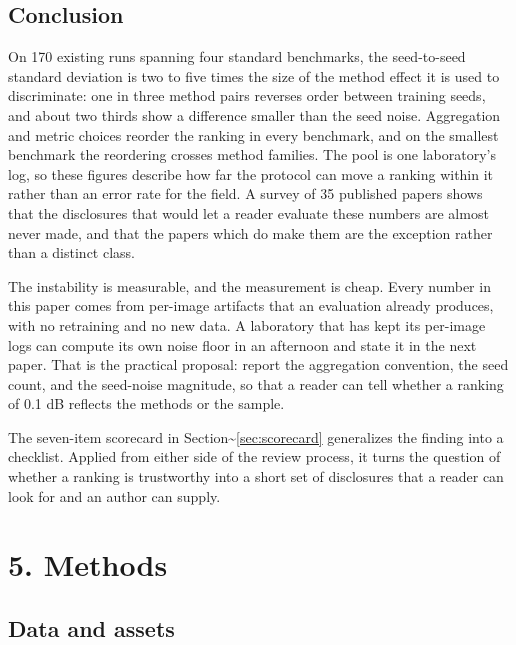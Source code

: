 \documentclass[pdflatex,sn-nature]{sn-jnl}
\begin{document}
\subsection{Conclusion}\label{sec:conclusion}

On 170 existing runs spanning four standard benchmarks, the seed-to-seed standard deviation is two to five times the size of the method effect it is used to discriminate: one in three method pairs reverses order between training seeds, and about two thirds show a difference smaller than the seed noise. Aggregation and metric choices reorder the ranking in every benchmark, and on the smallest benchmark the reordering crosses method families. The pool is one laboratory's log, so these figures describe how far the protocol can move a ranking within it rather than an error rate for the field. A survey of 35 published papers shows that the disclosures that would let a reader evaluate these numbers are almost never made, and that the papers which do make them are the exception rather than a distinct class.

The instability is measurable, and the measurement is cheap. Every number in this paper comes from per-image artifacts that an evaluation already produces, with no retraining and no new data. A laboratory that has kept its per-image logs can compute its own noise floor in an afternoon and state it in the next paper. That is the practical proposal: report the aggregation convention, the seed count, and the seed-noise magnitude, so that a reader can tell whether a ranking of 0.1 dB reflects the methods or the sample.

The seven-item scorecard in Section\textasciitilde{}\ref{sec:scorecard} generalizes the finding into a checklist. Applied from either side of the review process, it turns the question of whether a ranking is trustworthy into a short set of disclosures that a reader can look for and an author can supply.

\section{5. Methods}\label{sec:methods}

\subsection{Data and assets}\label{sec:assets}
\end{document}

